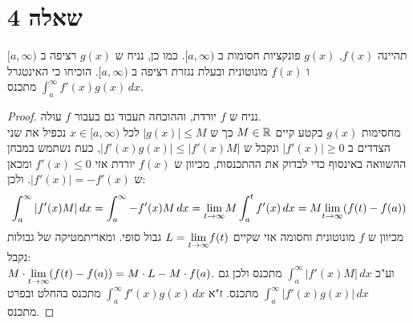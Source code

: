 \documentclass{article}
\begin{document}
	\pagebreak
	\section*{שאלה 4}
	תהיינה $f(x)$, $g(x)$ פונקציות חסומות ב $[a, \infty)$. כמו כן, נניח ש $g(x)$ רציפה ב $[a, \infty)$ ו $f(x)$ מונוטונית ובעלת נגזרת רציפה ב $[a, \infty)$.
	הוכיחו כי האינטגרל $\int_a^\infty f'(x)g(x) \, dx$ מתכנס.

	\begin{proof}
		נניח ש $f$ יורדת, וההוכחה תעבוד גם בעבור $f$ עולה. \\
		מחסימות $g(x)$ בקטע קיים $M \in \mathbb{R}$ כך ש $|g(x)| \leq M$ לכל $x \in [a, \infty)$
		נכפיל את שני הצדדים ב $|f'(x)| \geq 0$ ונקבל ש $|f'(x)g(x)| \leq |f'(x)M|$, כעת נשתמש במבחן ההשוואה באינסוף כדי לבדוק את ההתכנסות,
		מכיוון ש $f(x)$ יורדת אזי $f'(x) \leq 0$ ומכאן ש $|f'(x)| = -f'(x)$. ולכן:
		\[
		\int_a^\infty |f'(x)M| \, dx = \int_a^\infty -f'(x)M \, dx = \displaystyle{\lim_{t \to \infty}} M\int_a^t f'(x) \, dx = M \displaystyle{\lim_{t \to \infty}}(f(t) - f(a))
		\]
		מכיוון ש $f$ מונוטונית וחסומה אזי שקיים $L = \displaystyle{\lim_{t \to \infty}} f(t)$ גבול סופי. ומאריתמטיקה של גבולות נקבל: \\
		$M \cdot \displaystyle{\lim_{t \to \infty}}(f(t) - f(a)) = M \cdot L - M \cdot f(a)$.
		וע"כ $\int_a^\infty |f'(x)M| \, dx$ מתכנס ולכן גם $\int_a^\infty |f'(x)g(x)| \, dx$ מתכנס. ז"א $\int_a^\infty f'(x)g(x) \, dx$ מתכנס בהחלט ובפרט מתכנס.
	\end{proof}

	\pagebreak
\end{document}
